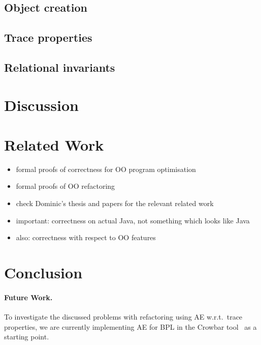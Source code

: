 \documentclass[runningheads]{llncs}
\begin{document}

\subsection{Object creation}\label{sec:objectcreation}


\subsection{Trace properties}\label{sec:traces}


\subsection{Relational invariants}\label{sec:relational}


\section{Discussion}\label{sec:discussion}


\section{Related Work}\label{sec:related}

\begin{itemize}
\item formal proofs of correctness for OO program optimisation
\item formal proofs of OO refactoring
\item check Dominic's thesis and papers for the relevant related work
\item important: correctness on actual Java, not something which looks like Java
\item also: correctness with respect to OO features
\end{itemize}



\section{Conclusion}\label{sec:conclusion}


\paragraph{Future Work.} 
To investigate the discussed problems with refactoring using AE w.r.t.\ trace properties, we are currently implementing AE for BPL in the Crowbar tool~\cite{crowbar} as a starting point.
\end{document}
